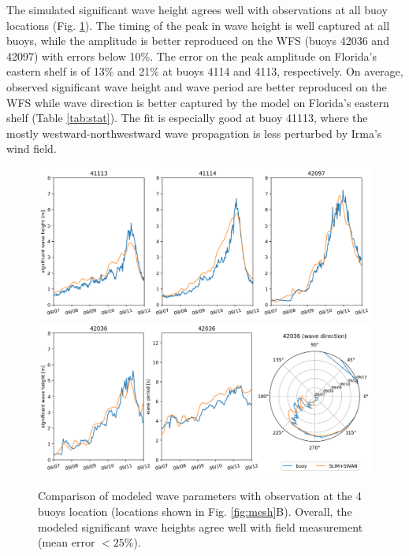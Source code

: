 \documentclass[preprint,12pt,authoryear]{elsarticle}
\begin{document}
The simulated significant wave height agrees well with observations at all buoy locations (Fig. \ref{fig:waves}). The timing of the peak in wave height is well captured at all buoys, while the amplitude is better reproduced on the WFS (buoys 42036 and 42097) with errors below 10\%. The error on the peak amplitude on Florida's eastern shelf is of 13\% and 21\% at buoys 4114 and 4113, respectively. On average, observed significant wave height and wave period are better reproduced on the WFS while wave direction is better captured by the model on Florida's eastern shelf (Table \ref{tab:stat}). The fit is especially good at buoy 41113, where the mostly westward-northwestward wave propagation is less perturbed by Irma's wind field.
\begin{figure}
    \centering
    \includegraphics[width=\textwidth]{figures/hsig_validation.png}
    \includegraphics[width=\textwidth]{figures/wave_validation_42036.png}
    \caption{Comparison of modeled wave parameters with observation at the 4 buoys location (locations shown in Fig. \ref{fig:mesh}B). Overall, the modeled significant wave heights agree well with field measurement (mean error $<25$\%). }
    \label{fig:waves}
\end{figure}
\end{document}
